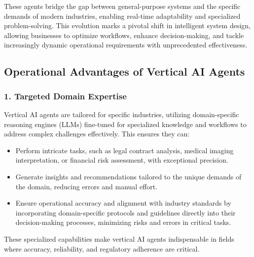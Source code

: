 \documentclass[12pt]{article}
\begin{document}
These agents bridge the gap between general-purpose systems and the specific demands of modern industries, enabling real-time adaptability and specialized problem-solving. This evolution marks a pivotal shift in intelligent system design, allowing businesses to optimize workflows, enhance decision-making, and tackle increasingly dynamic operational requirements with unprecedented effectiveness.

\subsection{Operational Advantages of Vertical AI Agents}

\subsubsection{1. Targeted Domain Expertise}
Vertical AI agents are tailored for specific industries, utilizing domain-specific reasoning engines (LLMs) fine-tuned for specialized knowledge and workflows to address complex challenges effectively. This ensures they can:
\begin{itemize}
    \item Perform intricate tasks, such as legal contract analysis, medical imaging interpretation, or financial risk assessment, with exceptional precision.
    \item Generate insights and recommendations tailored to the unique demands of the domain, reducing errors and manual effort.
    \item Ensure operational accuracy and alignment with industry standards by incorporating domain-specific protocols and guidelines directly into their decision-making processes, minimizing risks and errors in critical tasks.
\end{itemize}
These specialized capabilities make vertical AI agents indispensable in fields where accuracy, reliability, and regulatory adherence are critical.
\end{document}
